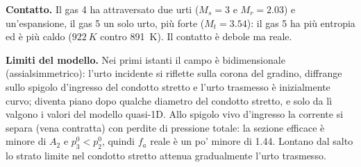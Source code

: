 \documentclass[11pt,a4paper]{article}
\newcommand{\Mr}{M_{r}}
\newcommand{\fa}{f_a}
\begin{document}
\textbf{Contatto.} Il gas 4 ha attraversato due urti ($M_s=3$ e $\Mr=\num{2.03}$) e un'espansione, il gas 5
un solo urto, più forte ($M_t=\num{3.54}$): il gas 5 ha più entropia ed è più caldo ($\SI{922}{K}$ contro
\SI{891}{K}). Il contatto è debole ma reale.

\textbf{Limiti del modello.} Nei primi istanti il campo è bidimensionale (assialsimmetrico): l'urto incidente
si riflette sulla corona del gradino, diffrange sullo spigolo d'ingresso del condotto stretto e l'urto
trasmesso è inizialmente curvo; diventa piano dopo qualche diametro del condotto stretto, e solo da lì valgono
i valori del modello quasi-1D. Allo spigolo vivo d'ingresso la corrente si separa (vena contratta) con perdite
di pressione totale: la sezione efficace è minore di $A_2$ e $p^0_3<p^0_2$, quindi $\fa$ reale è
un po' minore di \num{1.44}. Lontano dal salto lo strato limite nel condotto stretto attenua gradualmente
l'urto trasmesso.
\end{document}
